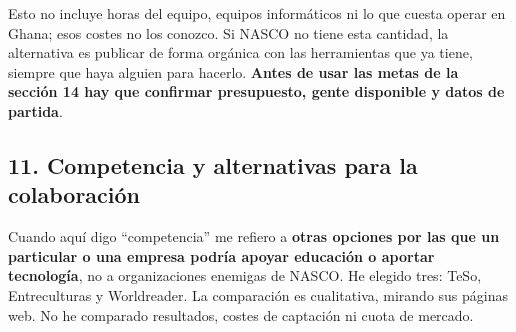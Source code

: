 \documentclass[
]{article}
\begin{document}
Esto no incluye horas del equipo, equipos informáticos ni lo que cuesta
operar en Ghana; esos costes no los conozco. Si NASCO no tiene esta
cantidad, la alternativa es publicar de forma orgánica con las
herramientas que ya tiene, siempre que haya alguien para hacerlo.
\textbf{Antes de usar las metas de la sección 14 hay que confirmar
presupuesto, gente disponible y datos de partida}.

\hypertarget{competencia-y-alternativas-para-la-colaboraciuxf3n}{%
\subsection{11. Competencia y alternativas para la
colaboración}\label{competencia-y-alternativas-para-la-colaboraciuxf3n}}

Cuando aquí digo ``competencia'' me refiero a \textbf{otras opciones por
las que un particular o una empresa podría apoyar educación o aportar
tecnología}, no a organizaciones enemigas de NASCO. He elegido tres:
TeSo, Entreculturas y Worldreader. La comparación es cualitativa,
mirando sus páginas web. No he comparado resultados, costes de captación
ni cuota de mercado.
\end{document}
